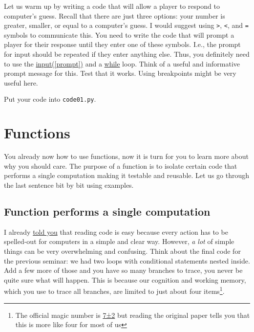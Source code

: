 \documentclass[
]{book}
\begin{document}
Let us warm up by writing a code that will allow a player to respond to computer's guess. Recall that there are just three options: your number is greater, smaller, or equal to a computer's guess. I would suggest using \texttt{\textgreater{}}, \texttt{\textless{}}, and \texttt{=} symbols to communicate this. You need to write the code that will prompt a player for their response until they enter one of these symbols. I.e., the prompt for input should be repeated if they enter anything else. Thus, you definitely need to use the \href{https://docs.python.org/3/library/functions.html\#input}{input({[}prompt{]})} and a \protect\hyperlink{while-loop}{while} loop. Think of a useful and informative prompt message for this. Test that it works. Using breakpoints might be very useful here.

Put your code into \texttt{code01.py}.

\hypertarget{function}{%
\section{Functions}\label{function}}

You already now how to use functions, now it is turn for you to learn more about why you should care. The purpose of a function is to isolate certain code that performs a single computation making it testable and reusable. Let us go through the last sentence bit by bit using examples.

\hypertarget{function-performs-a-single-computation}{%
\subsection{Function performs a single computation}\label{function-performs-a-single-computation}}

I already \protect\hyperlink{programming-tips}{told you} that reading code is easy because every action has to be spelled-out for computers in a simple and clear way. However, \emph{a lot} of simple things can be very overwhelming and confusing. Think about the final code for the previous seminar: we had two loops with conditional statements nested inside. Add a few more of those and you have so many branches to trace, you never be quite sure what will happen. This is because our cognition and working memory, which you use to trace all branches, are limited to just about four items\footnote{The official magic number is \href{https://en.wikipedia.org/wiki/The_Magical_Number_Seven,_Plus_or_Minus_Two}{7±2} but reading the original paper tells you that this is more like four for most of us}.
\end{document}

